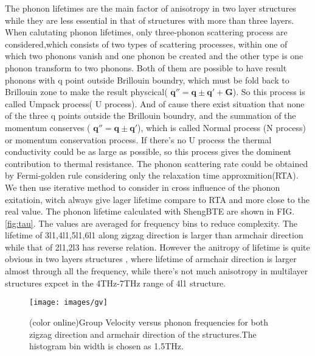 \documentclass[%
 reprint,
 amsmath,amssymb,
 aps,
 prb,
]{revtex4-1}
\begin{document}
The phonon lifetimes are the main factor of anisotropy in two layer structures while they are less essential in that of structures with more than three layers. When calutating phonon lifetimes, only three-phonon scattering process are considered,which consists of two types of scattering processes, within one of which  two phonons vanish and one phonon be created and the other type is one phonon transform to two phonons. Both of them are possible to have result phonons with q point outside Brillouin boundry, which must be fold back to Brillouin zone to make the result physcical( $\mathbf{q''}=\mathbf{q} \pm \mathbf{q'}+\mathbf{G}$). So this process is called Umpack process( U process). And of cause there exist  situation that none of the three q points outside the Brillouin boundry, and the summation of the momentum conserves ( $\mathbf{q''}=\mathbf{q} \pm \mathbf{q'}$), which is called Normal process (N process) or momentum conservation process. If there's no U process the thermal conductivity could be as large as possible, so this process gives the dominent contribution to thermal resistance. The phonon scattering rate could be obtained by Fermi-golden rule\cite{Li2014} considering only the relaxation time approxmition(RTA). We then use iterative method to consider in cross influence of the phonon exitatioin, witch always give lager lifetime compare to RTA and more close to the real value. The phonon lifetime calculated with ShengBTE\cite{Li2014} are shown in FIG.\ref{fig:tau}. The values are averaged for frequency bins to reduce complexity. The lifetime of 3l1,4l1,5l1,6l1 along zigzag direction is larger than armchair direction while that of 2l1,2l3 has reverse relation. However the anitropy of lifetime  is quite obvious in two layers structures , where lifetime of armchair direction is larger almost through all the frequency, while there's not much anisotropy in multilayer structures expcet in the 4THz-7THz range of 4l1 structure.

\begin{figure}[b]
  \texttt{[image: images/gv]}{}
  \caption{\label{fig:gv} (color online)Group Velocity versus phonon frequencies for both zigzag direction and armchair direction of the structures.The histogram bin width is chosen as 1.5THz.}
\end{figure}
\end{document}
